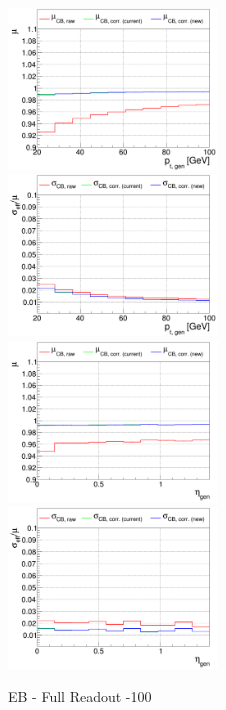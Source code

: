 \begin{figure}
\includegraphics[width=0.495\textwidth]{./plots_pdf/ECAL_plots/plotsPU/EB/FULL/pdf/GENPT/EBFULL_GENPT_0020_0100_MuOverBins.pdf}
\includegraphics[width=0.495\textwidth]{./plots_pdf/ECAL_plots/plotsPU/EB/FULL/pdf/GENPT/EBFULL_GENPT_0020_0100_EffSigmaOverBins.pdf}
\includegraphics[width=0.495\textwidth]{./plots_pdf/ECAL_plots/plotsPU/EB/FULL/pdf/GENETA/EBFULL_GENETA_0020_0100_MuOverBins.pdf}
\includegraphics[width=0.495\textwidth]{./plots_pdf/ECAL_plots/plotsPU/EB/FULL/pdf/GENETA/EBFULL_GENETA_0020_0100_EffSigmaOverBins.pdf}
\caption{EB - Full Readout -100}
\end{figure}


